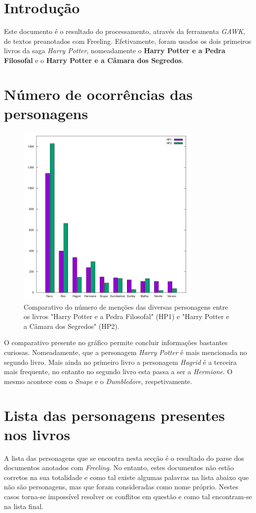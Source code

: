 \documentclass[a4paper]{article}
\begin{document}
\section{Introdução}
Este documento é o resultado do processamento, através da ferramenta \textit{GAWK}, de textos preanotados com Freeling. Efetivamente, foram usados os dois primeiros livros da saga \textit{Harry Potter}, nomeadamente o \textbf{Harry Potter e a Pedra Filosofal} e o \textbf{Harry Potter e a Câmara dos Segredos}.
\section{Número de ocorrências das personagens}
\begin{figure}[h!]
\centering
\includegraphics[width=9cm]{./imagens/output.png}
\caption{Comparativo do número de menções das diversas personagens entre os livros "Harry Potter e a Pedra Filosofal" (HP1) e "Harry Potter e a Câmara dos Segredos" (HP2).}
\label{fig:plot}
\end{figure}
O comparativo presente no gráfico permite concluir informações bastantes curiosas. Nomeadamente, que a personagem \textit{Harry Potter} é mais mencionada no segundo livro. Mais ainda no primeiro livro a personagem \textit{Hagrid} é a terceira mais frequente, no entanto no segundo livro esta passa a ser a \textit{Hermione}. O mesmo acontece com o \textit{Snape} e o \textit{Dumbledore}, respetivamente.
\newpage
\section{Lista das personagens presentes nos livros}
\hspace{4mm} A lista das personagens que se encontra nesta secção é o resultado do parse dos documentos anotados com \textit{Freeling}. No entanto, estes documentos não estão corretos na sua totalidade e como tal existe algumas palavras na lista abaixo que não são personagens, mas que foram consideradas como nome próprio. Nestes casos torna-se impossível resolver os conflitos em questão e como tal encontram-se na lista final.
\end{document}
